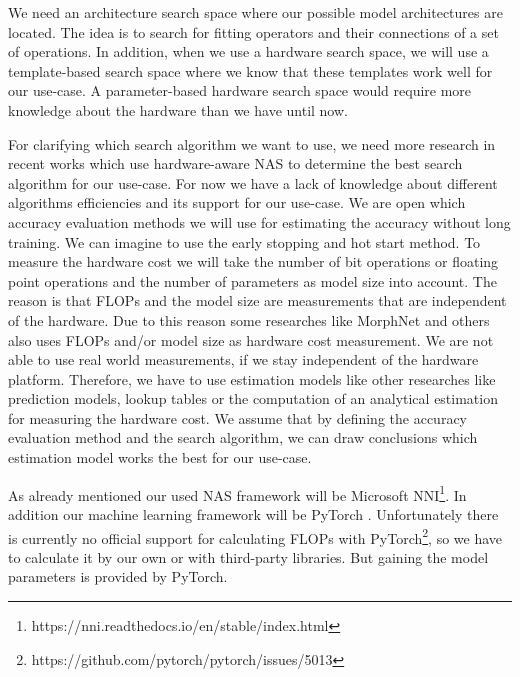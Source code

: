 \documentclass[conference]{IEEEtran}
\begin{document}
We need an architecture search space where our possible model architectures are located. The idea is to search for fitting operators and their connections of a set of operations. In addition, when we use a hardware search space, we will use a template-based search space where we know that these templates work well for our use-case. A parameter-based hardware search space would require more knowledge about the hardware than we have until now. 

For clarifying which search algorithm we want to use, we need more research in recent works which use hardware-aware NAS to determine the best search algorithm for our use-case. For now we have a lack of knowledge about different algorithms efficiencies and its support for our use-case. We are open which accuracy evaluation methods we will use for estimating the accuracy without long training. We can imagine to use the early stopping and hot start method. To measure the hardware cost we will take the number of bit operations or floating point operations and the number of parameters as model size into account. The reason is that FLOPs and the model size are measurements that are independent of the hardware. Due to this reason some researches like MorphNet \cite{bib10} and others also uses FLOPs \cite{bib5}\cite{bib11}\cite{bib13} and/or model size \cite{bib12} as hardware cost measurement. We are not able to use real world measurements, if we stay independent of the hardware platform. Therefore, we have to use estimation models like other researches like prediction models\cite{bib20}, lookup tables\cite{bib19} or the computation of an analytical estimation\cite{bib21} for measuring the hardware cost. We assume that by defining the accuracy evaluation method and the search algorithm, we can draw conclusions which estimation model works the best for our use-case.

As already mentioned our used NAS framework will be Microsoft NNI\footnote{https://nni.readthedocs.io/en/stable/index.html}. In addition our machine learning framework will be PyTorch \cite{bib4}. Unfortunately there is currently no official support for calculating FLOPs with PyTorch\footnote{https://github.com/pytorch/pytorch/issues/5013}, so we have to calculate it by our own or with third-party libraries. But gaining the model parameters is provided by PyTorch.
\end{document}
